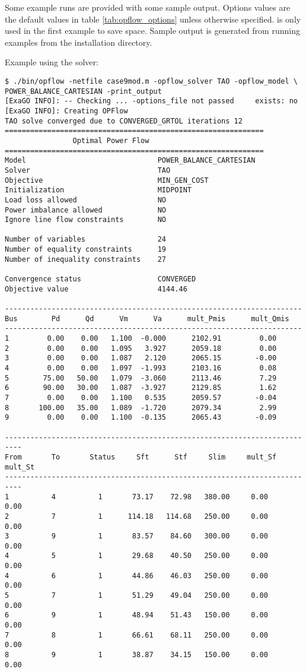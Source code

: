 Some \opflow example runs are provided with some sample output. Options values are the default values in table \ref{tab:opflow_options} unless otherwise specified.  is only used in the first example to save space. Sample output is generated from running examples from the installation directory.

Example using the \tao solver:

\begin{lstlisting}
$ ./bin/opflow -netfile case9mod.m -opflow_solver TAO -opflow_model \
POWER_BALANCE_CARTESIAN -print_output
[ExaGO INFO]: -- Checking ... -options_file not passed     exists: no
[ExaGO INFO]: Creating OPFlow
TAO solve converged due to CONVERGED_GRTOL iterations 12
=============================================================
                Optimal Power Flow
=============================================================
Model                               POWER_BALANCE_CARTESIAN
Solver                              TAO
Objective                           MIN_GEN_COST
Initialization                      MIDPOINT
Load loss allowed                   NO
Power imbalance allowed             NO
Ignore line flow constraints        NO

Number of variables                 24
Number of equality constraints      19
Number of inequality constraints    27

Convergence status                  CONVERGED
Objective value                     4144.46

----------------------------------------------------------------------
Bus        Pd      Qd      Vm      Va      mult_Pmis      mult_Qmis
----------------------------------------------------------------------
1         0.00    0.00   1.100  -0.000      2102.91         0.00
2         0.00    0.00   1.095   3.927      2059.18         0.00
3         0.00    0.00   1.087   2.120      2065.15        -0.00
4         0.00    0.00   1.097  -1.993      2103.16         0.08
5        75.00   50.00   1.079  -3.060      2113.46         7.29
6        90.00   30.00   1.087  -3.927      2129.85         1.62
7         0.00    0.00   1.100   0.535      2059.57        -0.04
8       100.00   35.00   1.089  -1.720      2079.34         2.99
9         0.00    0.00   1.100  -0.135      2065.43        -0.09

--------------------------------------------------------------------------
From       To       Status     Sft      Stf     Slim     mult_Sf  mult_St
--------------------------------------------------------------------------
1          4          1       73.17    72.98   380.00     0.00     0.00
2          7          1      114.18   114.68   250.00     0.00     0.00
3          9          1       83.57    84.60   300.00     0.00     0.00
4          5          1       29.68    40.50   250.00     0.00     0.00
4          6          1       44.86    46.03   250.00     0.00     0.00
5          7          1       51.29    49.04   250.00     0.00     0.00
6          9          1       48.94    51.43   150.00     0.00     0.00
7          8          1       66.61    68.11   250.00     0.00     0.00
8          9          1       38.87    34.15   150.00     0.00     0.00


\end{lstlisting}
